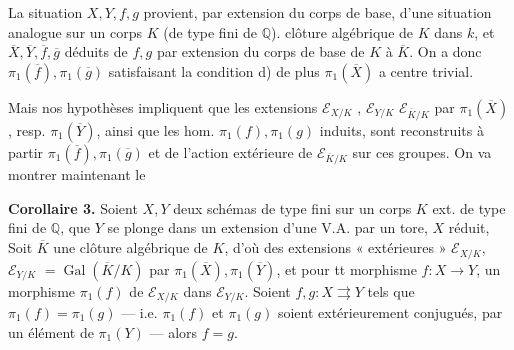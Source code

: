 \documentclass[11pt,a4paper]{article}
\begin{document}


La situation $X, Y, f, g$ provient, par extension du corps de base, d'une situation analogue sur un corps $K$  (de type fini  de $\mathbb{Q}$).   clôture algébrique  de $K$ dans $k$, \struck{\ill{}} et $\overline{X}, \overline{Y}, \overline{f}, \overline{g}$  déduits de  $f, g$ par extension du corps de base de $K$ à $\overline{K}$. On a donc $\pi_1(\overline{f}), \pi_1(\overline{g})$ satisfaisant la condition d)  de plus $\pi_1(\overline{X})$ a centre trivial.

Mais nos hypothèses impliquent que les extensions $\mathcal{E}_{X/K}$ , $\mathcal{E}_{Y/K}$   $\mathcal{E}_{\overline{K}/K}$ par $\pi_1(\overline{X})$, resp. $\pi_1(\overline{Y})$, ainsi que les hom. $\pi_1(f), \pi_1(g)$ induits, sont reconstruits à partir  $\pi_1(\overline{f}), \pi_1(\overline{g})$ et de l'action extérieure de $\mathcal{E}_{\overline{K}/K}$ sur ces groupes. On va montrer maintenant le

\textbf{Corollaire 3.} Soient  $X, Y$ deux schémas de type fini sur un corps $K$ ext. de type fini de $\mathbb{Q}$,   que $Y$ se plonge dans un  extension d'une V.A. par un tore, $X$ réduit,   Soit $\overline{K}$ une clôture algébrique de $K$, d'où des extensions « extérieures » $\mathcal{E}_{X/K}$, $\mathcal{E}_{Y/K}$  $= \operatorname{Gal}(\overline{K}/K)$ par $\pi_1(\overline{X}), \pi_1(\overline{Y})$, et pour tt morphisme $f : X \to Y$, un morphisme $\pi_1(f)$ de $\mathcal{E}_{X/K}$  dans $\mathcal{E}_{Y/K}$. Soient $f, g : X \rightrightarrows Y$ tels que $\pi_1(f) = \pi_1(g)$ — i.e. $\pi_1(f)$ et $\pi_1(g)$ soient extérieurement conjugués, par un élément de $\pi_1(Y)$ — alors $f = g$.
\end{document}
